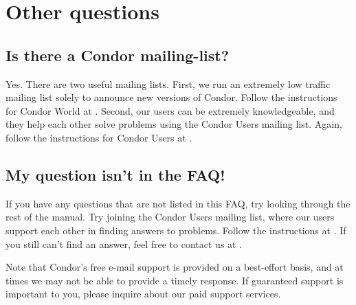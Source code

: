 \section{Other questions}


\subsection*{Is there a Condor mailing-list?}

Yes. There are two useful mailing lists.
First, we run an extremely low traffic mailing list solely to announce new
versions of Condor.
Follow the instructions for Condor World at
.
Second, our users can be extremely knowledgeable,
and they help each other solve problems
using the Condor Users mailing list.
Again, follow the instructions for Condor Users at
.



\subsection*{My question isn't in the FAQ!}

If you have any questions that are not listed in this FAQ, try looking
through the rest of the manual.
Try joining the Condor Users mailing list, where our users
support each other in finding answers to problems.
Follow the instructions at
.
If you still can't find an answer, feel free to contact us at
.

Note that Condor's free e-mail support is provided on a best-effort
basis, and at times we may not be able to provide a timely response.
If guaranteed support is important to you, please inquire about our
paid support services.



